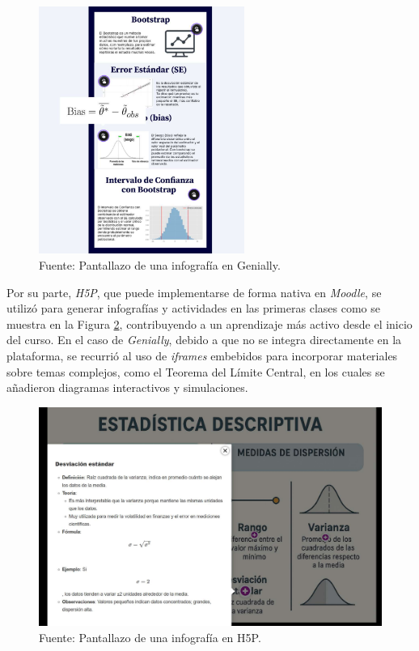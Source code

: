 \documentclass[letter,oneside,12pt,spanish]{report}
\begin{document}
\begin{figure}[ht]
	\centering
	\includegraphics[width=0.6\textwidth]{Figs/Infografia_Genially.pdf}
	\label{fig:Igenially}
	\\Fuente: Pantallazo de una infografía en Genially.
\end{figure}

Por su parte, \textit{H5P}, que puede implementarse de forma nativa en \textit{Moodle}, se utilizó para generar infografías y actividades en las primeras clases como se muestra en la Figura \ref{fig:H5P}, contribuyendo a un aprendizaje más activo desde el inicio del curso. En el caso de \textit{Genially}, debido a que no se integra directamente en la plataforma, se recurrió al uso de \textit{iframes} embebidos para incorporar materiales sobre temas complejos, como el Teorema del Límite Central, en los cuales se añadieron diagramas interactivos y simulaciones.

\begin{figure}[ht]
	\centering
	\includegraphics[width=1\textwidth]{Figs/Infografia_H5P.pdf}
	\label{fig:H5P}
	\\Fuente: Pantallazo de una infografía en H5P.
\end{figure}
\end{document}
